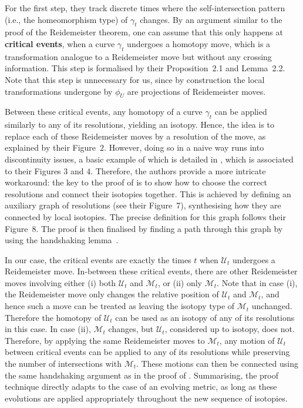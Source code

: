 \documentclass{article}
\begin{document}
For the first step, they track discrete times where the self-intersection pattern (i.e., the homeomorphism type) of $\gamma_t$ changes. By an argument similar to the proof of the Reidemeister theorem, one can assume that this only happens at \textbf{critical events}, when a curve $\gamma_t$ undergoes a homotopy move, which is a transformation analogue to a Reidemeister move but without any crossing information. This step is formalised by their Proposition~2.1 and Lemma~2.2. Note that this step is unnecessary for us, since by construction the local transformations undergone by $\phi_U$ are projections of Reidemeister moves.

Between these critical events, any homotopy of a curve $\gamma_t$ can be applied similarly to any of its resolutions, yielding an isotopy. Hence, the idea is to replace each of these Reidemeister moves by a resolution of the move, as explained by their Figure~$2$. However, doing so in a naive way runs into discontinuity issues, a basic example of which is detailed in \cite[Example~2]{Chambers_homo-isotopy}, which is associated to their Figures $3$ and $4$. Therefore, the authors provide a more intricate workaround: the key to the proof of  is to show how to choose the correct resolutions and connect their isotopies together. This is achieved by defining an auxiliary graph of resolutions (see their Figure~7), synthesising how they are connected by local isotopies. The precise definition for this graph follows their Figure~8. The proof is then finalised by finding a path through this graph by using the handshaking lemma~\cite{Euler_bridges}. 

In our case, the critical events are exactly the times $t$ when $\mathcal{U}_t$ undergoes a Reidemeister move. In-between these critical events, there are other Reidemeister moves involving either (i) both $\mathcal{U}_t$ and $\mathcal{M}_t$, or (ii) only $\mathcal{M}_t$. Note that in case (i), the Reidemeister move only changes the relative position of $\mathcal{U}_t$ and $\mathcal{M}_t$, and hence such a move can be treated as leaving the isotopy type of $\mathcal{M}_t$ unchanged. Therefore the homotopy of $\mathcal{U}_t$ can be used as an isotopy of any of its resolutions in this case. In case (ii), $\mathcal{M}_t$ changes, but $\mathcal{U}_t$, considered up to isotopy, does not. Therefore, by applying the same Reidemeister moves to $\mathcal{M}_t$, any motion of $\mathcal{U}_t$ between critical events can be applied to any of its resolutions while preserving the number of intersections with $\mathcal{M}_t$. These motions can then be connected using the same handshaking argument as in the proof of . Summarising, the proof technique directly adapts to the case of an evolving metric, as long as these evolutions are applied appropriately throughout the new sequence of isotopies.
\end{document}
